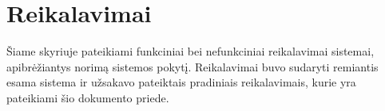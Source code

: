 \documentclass{VUMIFPSkursinis}
\begin{document}
%
\setcounter{secnumdepth}{4}

\section{Reikalavimai}
	Šiame skyriuje pateikiami funkciniai bei nefunkciniai reikalavimai sistemai, apibrėžiantys norimą sistemos pokytį.
	Reikalavimai buvo sudaryti remiantis esama sistema ir užsakavo pateiktais pradiniais reikalavimais,
	kurie yra pateikiami šio dokumento priede.
\end{document}
